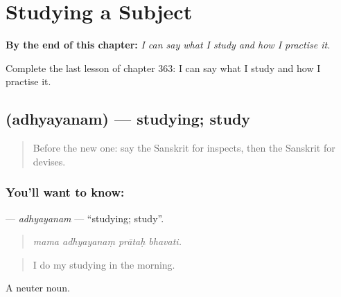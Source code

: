 
\chapter{Studying a Subject}
\label{ch:sa-studying-a-subject}

\begin{chapteropening}
\textbf{By the end of this chapter:} \emph{I can say what I study and how I practise it.}

Complete the last lesson of chapter 363: I can say what I study and how I practise it.
\end{chapteropening}

\section[\texorpdfstring{\sk{अध्ययनम्} (adhyayanam)}{अध्ययनम् (adhyayanam)}]{ (adhyayanam) — studying; study}

\label{lesson:SA-C363-adhyayanam}



\begin{quote}
Before the new one: say the Sanskrit for inspects, then the Sanskrit for devises.
\end{quote}

\subsection*{You'll want to know: }
\textbf{} — \emph{adhyayanam} — \textquotedblleft{}studying; study\textquotedblright{}.

\begin{quote}
   
\end{quote}

\begin{quote}
\emph{mama adhyayanaṃ prātaḥ bhavati.}
\end{quote}

\begin{quote}
I do my studying in the morning.
\end{quote}

A neuter noun.

